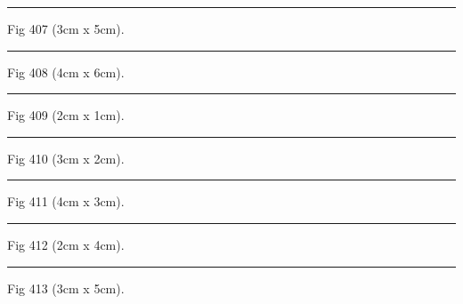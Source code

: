 \documentclass[a4paper,11pt]{article}
\begin{document}
\begin{swarmwrap}%
  \begin{minipage}[t]{3cm}
    \centering
    \rule{\linewidth}{5cm}
    {\footnotesize Fig 407 (3cm x 5cm).}
  \end{minipage}%
\end{swarmwrap}%
\swarmwrapnext
\lipsum[107]%

\begin{swarmwrap}%
  \begin{minipage}[t]{4cm}
    \centering
    \rule{\linewidth}{6cm}
    {\footnotesize Fig 408 (4cm x 6cm).}
  \end{minipage}%
\end{swarmwrap}%
\swarmwrapnext
\lipsum[108]%

\begin{swarmwrap}%
  \begin{minipage}[t]{2cm}
    \centering
    \rule{\linewidth}{1cm}
    {\footnotesize Fig 409 (2cm x 1cm).}
  \end{minipage}%
\end{swarmwrap}%
\swarmwrapnext
\lipsum[109]%

\begin{swarmwrap}%
  \begin{minipage}[t]{3cm}
    \centering
    \rule{\linewidth}{2cm}
    {\footnotesize Fig 410 (3cm x 2cm).}
  \end{minipage}%
\end{swarmwrap}%
\swarmwrapnext
\lipsum[110]%

\begin{swarmwrap}%
  \begin{minipage}[t]{4cm}
    \centering
    \rule{\linewidth}{3cm}
    {\footnotesize Fig 411 (4cm x 3cm).}
  \end{minipage}%
\end{swarmwrap}%
\swarmwrapnext
\lipsum[111]%

\begin{swarmwrap}%
  \begin{minipage}[t]{2cm}
    \centering
    \rule{\linewidth}{4cm}
    {\footnotesize Fig 412 (2cm x 4cm).}
  \end{minipage}%
\end{swarmwrap}%
\swarmwrapnext
\lipsum[112]%

\begin{swarmwrap}%
  \begin{minipage}[t]{3cm}
    \centering
    \rule{\linewidth}{5cm}
    {\footnotesize Fig 413 (3cm x 5cm).}
  \end{minipage}%
\end{swarmwrap}%
\swarmwrapnext
\lipsum[113]%
\end{document}
